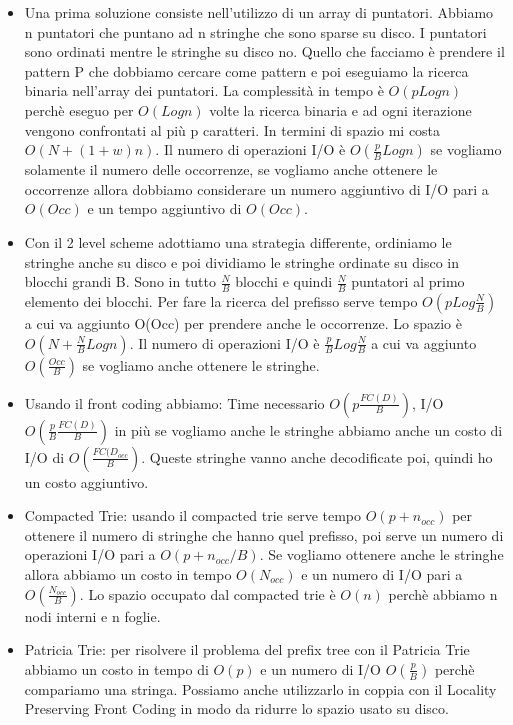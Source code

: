 \documentclass[12pt]{article}
\begin{document}
\begin{itemize}
\item Una prima soluzione consiste nell'utilizzo di un array di puntatori. Abbiamo n puntatori che puntano ad n stringhe che sono sparse su disco. I puntatori sono ordinati mentre le stringhe su disco no. Quello che facciamo è prendere il pattern P che dobbiamo cercare come pattern e poi eseguiamo la ricerca binaria nell'array dei puntatori. La complessità in tempo è $O(pLogn)$ perchè eseguo per $O(Logn)$ volte la ricerca binaria e ad ogni iterazione vengono confrontati al più p caratteri. In termini di spazio mi costa $O(N+(1+w)n)$. Il numero di operazioni I/O è $O(\frac{p}{B}Logn)$ se vogliamo solamente il numero delle occorrenze, se vogliamo anche ottenere le occorrenze allora dobbiamo considerare un numero aggiuntivo di I/O pari a $O(Occ)$ e un tempo aggiuntivo di $O(Occ)$.
\item Con il 2 level scheme adottiamo una strategia differente, ordiniamo le stringhe anche su disco e poi dividiamo le stringhe ordinate su disco in blocchi grandi B. Sono in tutto $\frac{N}{B}$ blocchi e quindi $\frac{N}{B}$ puntatori al primo elemento dei blocchi.
Per fare la ricerca del prefisso serve tempo $O(pLog\frac{N}{B})$ a cui va aggiunto O(Occ) per prendere anche le occorrenze.
Lo spazio è $O(N+\frac{N}{B}Logn)$.
Il numero di operazioni I/O è $\frac{p}{B}Log\frac{N}{B}$ a cui va aggiunto $O(\frac{Occ}{B})$ se vogliamo anche ottenere le stringhe.
\item Usando il front coding abbiamo: Time necessario $O(p\frac{FC(D)}{B})$, I/O $O(\frac{p}{B}\frac{FC(D)}{B})$ in più se vogliamo anche le stringhe abbiamo anche un costo di I/O di $O(\frac{FC(D_{occ}}{B})$. Queste stringhe vanno anche decodificate poi, quindi ho un costo aggiuntivo.
\item Compacted Trie: usando il compacted trie serve tempo $O(p+n_{occ})$ per ottenere il numero di stringhe che hanno quel prefisso, poi serve un numero di operazioni I/O pari a $O(p+n_{occ}/B)$. Se vogliamo ottenere anche le stringhe allora abbiamo un costo in tempo $O(N_{occ})$ e un numero di I/O pari a $O(\frac{N_{occ}}{B})$. Lo spazio occupato dal compacted trie è $O(n)$ perchè abbiamo n nodi interni e n foglie.
\item Patricia Trie: per risolvere il problema del prefix tree con il Patricia Trie abbiamo un costo in tempo di $O(p)$ e un numero di I/O  $O(\frac{p}{B})$ perchè compariamo una stringa. Possiamo anche utilizzarlo in coppia con il Locality Preserving Front Coding in modo da ridurre lo spazio usato su disco.

\end{itemize}
\end{document}
